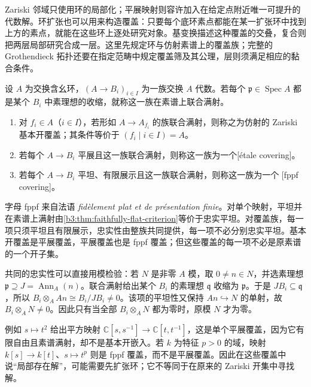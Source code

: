 Zariski 邻域只使用环的局部化；平展映射则容许加入在给定点附近唯一可提升的代数解。环扩张也可以用来构造覆盖：只要每个底环素点都能在某一扩张环中找到上方的素点，就能在这些环上逐处研究对象。基变换描述这种覆盖的交叠，复合则把两层局部研究合成一层。这里先规定环与仿射素谱上的覆盖族；完整的 Grothendieck 拓扑还要在指定范畴中规定覆盖筛及其公理，层则须满足相应的黏合条件。

\begin{definition}\label{b3:def:affine-etale-fppf-covers}
	设 \(A\) 为交换含幺环，\((A\to B_i)_{i\in I}\) 为一族交换 \(A\) 代数。若每个 \(\mathfrak p\in\operatorname{Spec}A\) 都是某个 \(B_i\) 中素理想的收缩，就称这一族在素谱上联合满射。
	\begin{enumerate}
		\item 对 \(f_i\in A\)（\(i\in I\)），若形如 \(A\to A_{f_i}\) 的族联合满射，则称之为仿射的 Zariski 基本开覆盖；其条件等价于 \((f_i\mid i\in I)=A\)。
		\item 若每个 \(A\to B_i\) 平展且这一族联合满射，则称这一族为一个[étale covering]。
		\item 若每个 \(A\to B_i\) 平坦、有限展示且这一族联合满射，则称这一族为一个 [fppf covering]。
	\end{enumerate}
\end{definition}

字母 fppf 来自法语 \emph{fidèlement plat et de présentation finie}。对单个映射，平坦并在素谱上满射由\cref{b3:thm:faithfully-flat-criterion}等价于忠实平坦。对覆盖族，每一项只须平坦且有限展示，忠实性由整族共同提供，每一项不必分别忠实平坦。基本开覆盖是平展覆盖，平展覆盖也是 fppf 覆盖；但这些覆盖的每一项不必是原素谱的一个开子集。

\ProseParagraphBreak
共同的忠实性可以直接用模检验：若 \(N\) 是非零 \(A\) 模，取 \(0\ne n\in N\)，并选素理想 \(\mathfrak p\supseteq J=\operatorname{Ann}_A(n)\)。联合满射给出某个 \(B_i\) 的素理想 \(\mathfrak q\) 收缩为 \(\mathfrak p\)。于是 \(JB_i\subseteq\mathfrak q\)，所以 \(B_i\otimes_AAn\cong B_i/JB_i\ne0\)。该项的平坦性又保持 \(An\hookrightarrow N\) 的单射，故 \(B_i\otimes_AN\ne0\)。因此只有当全部 \(B_i\otimes_AN\) 都为零时，原模 \(N\) 才为零。

\ProseParagraphBreak
例如 \(s\mapsto t^2\) 给出平方映射 \(\mathbb C[s,s^{-1}]\rightarrow\mathbb C[t,t^{-1}]\)，这是单个平展覆盖，因为它有限自由且素谱满射，却不是基本开嵌入。若 \(k\) 为特征 \(p>0\) 的域，映射 \(k[s]\rightarrow k[t]\)、\(s\mapsto t^p\) 则是 fppf 覆盖，而不是平展覆盖。因此在这些覆盖中说“局部存在解”，可能需要先扩张环；它不等同于在原来的 Zariski 开集中寻找解。

